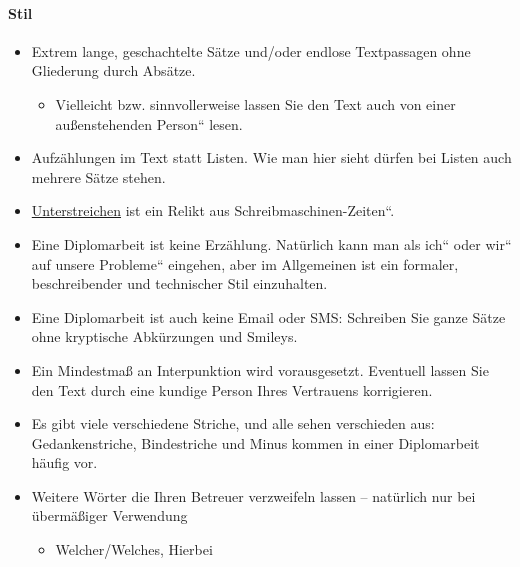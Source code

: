 \paragraph{Stil}
\begin{itemize}
\item Extrem lange, geschachtelte Sätze und/oder endlose Textpassagen ohne
Gliederung durch Absätze.\nopagebreak

\begin{itemize}
\item Vielleicht bzw. sinnvollerweise lassen Sie den Text auch von einer
\quotedblbase außenstehenden Person`` lesen. 
\end{itemize}
\item Aufzählungen im Text statt Listen. Wie man hier sieht dürfen bei Listen
auch mehrere Sätze stehen.
\item \uline{Unterstreichen} ist ein Relikt aus \quotedblbase Schreibmaschinen-Zeiten``.
\item Eine Diplomarbeit ist keine Erzählung. Natürlich kann man als \quotedblbase ich``
oder \quotedblbase wir`` auf \quotedblbase unsere Probleme`` eingehen,
aber im Allgemeinen ist ein formaler, beschreibender und technischer
Stil einzuhalten.
\item Eine Diplomarbeit ist auch keine Email oder SMS: Schreiben Sie ganze
Sätze ohne kryptische Abkürzungen und Smileys.
\item Ein Mindestmaß an Interpunktion wird vorausgesetzt. Eventuell lassen
Sie den Text durch eine kundige Person Ihres Vertrauens korrigieren.
\item Es gibt viele verschiedene Striche, und alle sehen verschieden aus:
Gedankenstriche, Bindestriche und Minus kommen in einer Diplomarbeit
häufig vor.
\item Weitere Wörter die Ihren Betreuer verzweifeln lassen -- natürlich
nur bei übermäßiger Verwendung

\begin{itemize}
\item Welcher/Welches, Hierbei
\end{itemize}
\end{itemize}

